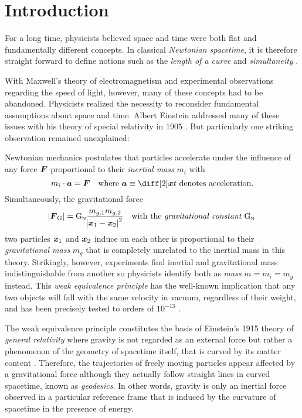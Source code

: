 \chapter{Introduction}\label{ch:intro}

For a long time, physicists believed space and time were both flat and fundamentally different concepts. In classical \emph{Newtonian spacetime}, it is therefore straight forward to define notions such as the \emph{length of a curve} and \emph{simultaneity} \autocite{Tolish}.

With Maxwell's theory of electromagnetism and experimental observations regarding the speed of light, however, many of these concepts had to be abandoned. Physicists realized the necessity to reconsider fundamental assumptions about space and time. Albert Einstein addressed many of these issues with his theory of special relativity in 1905 \autocite{Einstein1905}. But particularly one striking observation remained unexplained:

Newtonian mechanics postulates that particles accelerate under the influence of any force \(\boldsymbol{F}\) proportional to their \emph{inertial mass} \(m_i\) with \autocite{Newton1686}
\begin{equation}
	m_i \cdot \vect{a} = \vect{F} \quad \text{where \(\vect{a} \equiv \ddt{\vect{x}}\) denotes acceleration.}
\end{equation}
Simultaneously, the gravitational force
\begin{equation}
	\abs{\boldsymbol{F}_\textnormal{G}} = \mathrm{G}_\textnormal{\tiny{N}} \frac{m_{g,1}m_{g,2}}{\abs{\boldsymbol{x}_1-\boldsymbol{x}_2}^2} \quad \text{with the \emph{gravitational constant \(\mathrm{G}_\textnormal{\tiny{N}}\)}}
\end{equation}
two particles \(\boldsymbol{x}_1\) and \(\boldsymbol{x}_2\) induce on each other is proportional to their \emph{gravitational mass} \(m_g\) that is completely unrelated to the inertial mass in this theory. Strikingly, however, experiments find inertial and gravitational mass indistinguishable from another so physicists identify both as \emph{mass} \(m=m_i=m_g\) instead. This \emph{weak equivalence principle} has the well-known implication that any two objects will fall with the same velocity in vacuum, regardless of their weight, and has been precisely tested to orders of \(10^{-13}\) \autocite{Adelberger2001,Wagner2012}.

The weak equivalence principle constitutes the basis of Einstein's 1915 theory of \emph{general relativity} where gravity is not regarded as an external force but rather a phenomenon of the geometry of spacetime itself, that is curved by its matter content \autocite{Einstein1915}. Therefore, the trajectories of freely moving particles appear affected by a gravitational force although they actually follow straight lines in curved spacetime, known as \emph{geodesics}. In other words, gravity is only an inertial force observed in a particular reference frame that is induced by the curvature of spacetime in the presence of energy.

